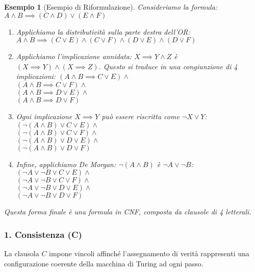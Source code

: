 \documentclass[a4paper]{article}
\newtheorem{example}{Esempio}
\begin{document}
\begin{example}[Esempio di Riformulazione]
Consideriamo la formula: $A \land B \implies (C \land D) \lor (E \land F)$
\begin{enumerate}
    \item Applichiamo la distributività sulla parte destra dell'OR:
    $A \land B \implies (C \lor E) \land (C \lor F) \land (D \lor E) \land (D \lor F)$
    \item Applichiamo l'implicazione annidata: $X \implies Y \land Z$ è $(X \implies Y) \land (X \implies Z)$.
    Questo si traduce in una congiunzione di 4 implicazioni:
    $(A \land B \implies C \lor E) \land$ \\
    $(A \land B \implies C \lor F) \land$ \\
    $(A \land B \implies D \lor E) \land$ \\
    $(A \land B \implies D \lor F)$
    \item Ogni implicazione $X \implies Y$ può essere riscritta come $\neg X \lor Y$:
    $(\neg (A \land B) \lor C \lor E) \land$ \\
    $(\neg (A \land B) \lor C \lor F) \land$ \\
    $(\neg (A \land B) \lor D \lor E) \land$ \\
    $(\neg (A \land B) \lor D \lor F)$
    \item Infine, applichiamo De Morgan: $\neg (A \land B)$ è $\neg A \lor \neg B$:
    $(\neg A \lor \neg B \lor C \lor E) \land$ \\
    $(\neg A \lor \neg B \lor C \lor F) \land$ \\
    $(\neg A \lor \neg B \lor D \lor E) \land$ \\
    $(\neg A \lor \neg B \lor D \lor F)$
\end{enumerate}
Questa forma finale è una formula in CNF, composta da clausole di 4 letterali.
\end{example}

\subsubsection{1. Consistenza (C)}
La clausola $C$ impone vincoli affinché l'assegnamento di verità rappresenti una configurazione coerente della macchina di Turing ad ogni passo.
\end{document}
